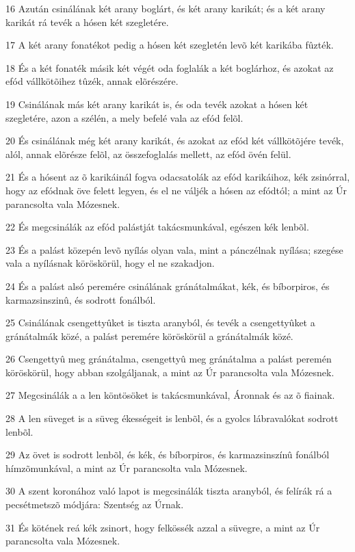 \par 16 Azután csinálának két arany boglárt, és két arany karikát; és a két arany karikát rá tevék a hósen két szegletére.
\par 17 A két arany fonatékot pedig a hósen két szegletén levõ két karikába fûzték.
\par 18 És a két fonaték másik két végét oda foglalák a két boglárhoz, és azokat az efód vállkötõihez tûzék, annak elõrészére.
\par 19 Csinálának más két arany karikát is, és oda tevék azokat a hósen két szegletére, azon a szélén, a mely befelé vala az efód felõl.
\par 20 És csinálának még két arany karikát, és azokat az efód két vállkötõjére tevék, alól, annak elõrésze felõl, az összefoglalás mellett, az efód övén felül.
\par 21 És a hósent az õ karikáinál fogva odacsatolák az efód karikáihoz, kék zsinórral, hogy az efódnak öve felett legyen, és el ne váljék a hósen az efódtól; a mint az Úr parancsolta vala Mózesnek.
\par 22 És megcsinálák az efód palástját takácsmunkával, egészen kék lenbõl.
\par 23 És a palást közepén levõ nyílás olyan vala, mint a pánczélnak nyílása; szegése vala a nyílásnak köröskörül, hogy el ne szakadjon.
\par 24 És a palást alsó peremére csinálának gránátalmákat, kék, és bíborpiros, és karmazsinszinû, és sodrott fonálból.
\par 25 Csinálának csengettyûket is tiszta aranyból, és tevék a csengettyûket a gránátalmák közé, a palást peremére köröskörül a gránátalmák közé.
\par 26 Csengettyû meg gránátalma, csengettyû meg gránátalma a palást peremén köröskörül, hogy abban szolgáljanak, a mint az Úr parancsolta vala Mózesnek.
\par 27 Megcsinálák a a len köntösöket is takácsmunkával, Áronnak és az õ fiainak.
\par 28 A len süveget is a süveg ékességeit is lenbõl, és a gyolcs lábravalókat sodrott lenbõl.
\par 29 Az övet is sodrott lenbõl, és kék, és bíborpiros, és karmazsinszínû fonálból hímzõmunkával, a mint az Úr parancsolta vala Mózesnek.
\par 30 A szent koronához való lapot is megcsinálák tiszta aranyból, és felírák rá a pecsétmetszõ módjára: Szentség az Úrnak.
\par 31 És kötének reá kék zsinort, hogy felkössék azzal a süvegre, a mint az Úr parancsolta vala Mózesnek.
